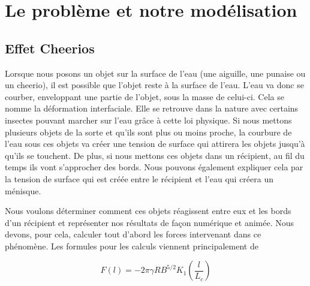 \documentclass[a4paper, 11pt, oneside]{article} %
\begin{document}
\section{Le problème et notre modélisation}
    \subsection{Effet Cheerios}
        Lorsque nous posons un objet sur la surface de l'eau (une aiguille, une punaise ou un cheerio), il est possible que l'objet reste à la surface de l'eau. L'eau va donc se courber, enveloppant une partie de l'objet, sous la masse de celui-ci. Cela se nomme la déformation interfaciale. Elle se retrouve dans la nature avec certains insectes pouvant marcher sur l'eau grâce à cette loi physique. Si nous mettons plusieurs objets de la sorte et qu'ils sont plus ou moins proche, la courbure de l'eau sous ces objets va créer une tension de surface qui attirera les objets jusqu'à qu'ils se touchent. De plus, si nous mettons ces objets dans un récipient, au fil du temps ils vont s'approcher des bords. Nous pouvons également expliquer cela par la tension de surface qui est créée entre le récipient et l'eau qui créera un ménisque.

        Nous voulons déterminer comment ces objets réagissent entre eux et les bords d'un récipient et représenter nos résultats de façon numérique et animée. Nous devons, pour cela, calculer tout d'abord les forces intervenant dans ce phénomène. Les formules pour les calculs viennent principalement de \cite{vella_cheerios_2005} 

        \begin{equation}
            \label{ForceEntreCheerios}
            F(l) = -2\pi \gamma R B^{5/2} K_1 \left( \frac{l}{L_c}\right)
        \end{equation}
        
        
        
\end{document}
